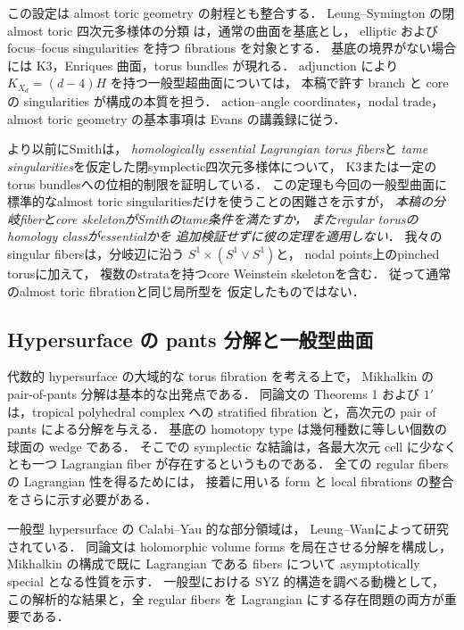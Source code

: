 この設定は almost toric geometry の射程とも整合する．
Leung--Symington の閉 almost toric 四次元多様体の分類
\cite[Theorem 2.1, Table 1]{LeungSymington}は，通常の曲面を基底とし，
elliptic および focus--focus singularities を持つ fibrations を対象とする．
基底の境界がない場合には K3，Enriques 曲面，torus bundles が現れる．
adjunction により $K_{X_d}=(d-4)H$ を持つ一般型超曲面については，
本稿で許す branch と core の singularities が構成の本質を担う．
action--angle coordinates，nodal trade，almost toric geometry の基本事項は
Evans の講義録\cite{Evans}に従う．

より以前にSmith\cite{IvanSmithTorus}は，
\emph{homologically essential Lagrangian torus fibers}と
\emph{tame singularities}を仮定した閉symplectic四次元多様体について，
K3または一定のtorus bundlesへの位相的制限を証明している．
この定理も今回の一般型曲面に標準的なalmost toric
singularitiesだけを使うことの困難さを示すが，
\emph{本稿の分岐fiberとcore skeletonがSmithのtame条件を満たすか，
またregular torusのhomology classがessentialかを
追加検証せずに彼の定理を適用しない}．
我々のsingular fibersは，分岐辺に沿う
$S^1\times(S^1\vee S^1)$と，
nodal points上のpinched torusに加えて，
複数のstrataを持つcore Weinstein skeletonを含む．
従って通常のalmost toric fibrationと同じ局所型を
仮定したものではない．

\subsection{Hypersurface の pants 分解と一般型曲面}

代数的 hypersurface の大域的な torus fibration を考える上で，
Mikhalkin の pair-of-pants 分解\cite{Mikhalkin}は基本的な出発点である．
同論文の Theorems 1 および $1'$ は，tropical polyhedral complex への
stratified fibration と，高次元の pair of pants による分解を与える．
基底の homotopy type は幾何種数に等しい個数の球面の wedge である．
そこでの symplectic な結論は，各最大次元 cell に少なくとも一つ
Lagrangian fiber が存在するというものである．
全ての regular fibers の Lagrangian 性を得るためには，
接着に用いる form と local fibrations の整合をさらに示す必要がある．

一般型 hypersurface の Calabi--Yau 的な部分領域は，
Leung--Wan\cite{LeungWan}によって研究されている．
同論文は holomorphic volume forms を局在させる分解を構成し，
Mikhalkin の構成で既に Lagrangian である fibers について
asymptotically special となる性質を示す．
一般型における SYZ 的構造を調べる動機として，
この解析的な結果と，全 regular fibers を Lagrangian にする存在問題の両方が重要である．


